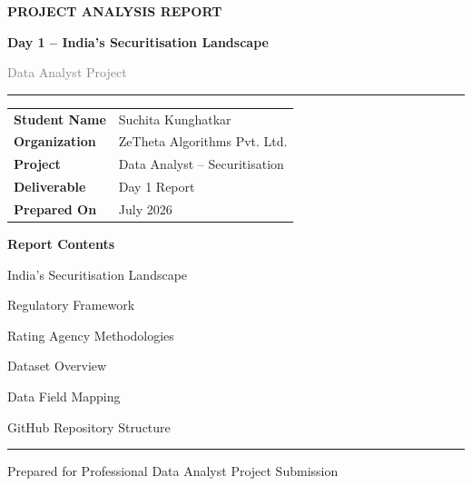 \begin{titlepage}
	
	\centering
	
	\vspace*{1cm}
	
	{\Huge\bfseries\color{PrimaryBlue}
		PROJECT ANALYSIS REPORT
	}
	
	\vspace{0.3cm}
	
	{\Large\bfseries
		Day 1 -- India's Securitisation Landscape
	}
	
	\vspace{0.8cm}
	
	\textcolor{gray}{Data Analyst Project}
	
	\vspace{0.6cm}
	
	\color{PrimaryBlue}
	\rule{\textwidth}{1.5pt}
	
	\vspace{1cm}
	
	\renewcommand{\arraystretch}{1.8}
	
	\begin{tabular}{>{\bfseries}p{5cm}p{9cm}}
		Student Name & Suchita Kunghatkar\\
		Organization & ZeTheta Algorithms Pvt. Ltd.\\
		Project & Data Analyst -- Securitisation\\
		Deliverable & Day 1 Report\\
		Prepared On & July 2026\\
	\end{tabular}
	
	\vfill
	
	\begin{tcolorbox}[
		colback=LightBlue,
		colframe=PrimaryBlue,
		width=0.95\textwidth,
		arc=3mm]
		
		\centering
		{\Large\bfseries Report Contents}
		
		\vspace{0.3cm}
		
		India's Securitisation Landscape
		
		Regulatory Framework
		
		Rating Agency Methodologies
		
		Dataset Overview
		
		Data Field Mapping
		
		GitHub Repository Structure
		
	\end{tcolorbox}
	
	\vfill
	
	\color{PrimaryBlue}
	\rule{\textwidth}{1.5pt}
	
	\vspace{0.4cm}
	
	{\large
		Prepared for Professional Data Analyst Project Submission
	}
	
\end{titlepage}